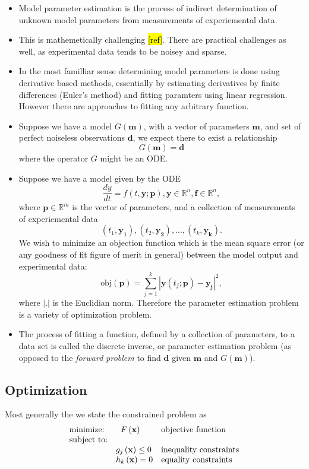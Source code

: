 \documentclass[10pt,a4paper]{article}
\begin{document}
\begin{itemize}
\item Model parameter estimation is the process of indirect determination of unknown model parameters  from measurements of experiemental data.
\item This is mathemetically challenging \hl{[ref]}. There are practical challenges as well, as experimental data tends to be noisey and sparse.
\item In the most familliar sense determining model parameters is done using derivative based methods, essentially by estimating derivatives by finite differences (Euler's method) and fitting paramters using linear regression. However there are approaches to fitting any arbitrary function.
\item Suppose we have a model $G(\mathbf{m})$, with a vector of parameters $\mathbf{m}$, and set of perfect noiseless observations $\mathbf{d}$, we expect there to exist a relationship 
\[G(\mathbf{m}) = \mathbf{d} \]
where the operator $G$ might be an ODE.
\item Suppose we have a model given by the ODE
\[ \frac{dy}{dt} = f(t, \mathbf{y}; \mathbf{p}), \mathbf{y} \in \mathbb{R}^n, \mathbf{f} \in \mathbb{R}^n ,\]
where $\mathbf{p} \in \mathbb{R}^m$ is the vector of parameters, and a collection of measurements of experiemental data
\[ \left( t_1, \mathbf{y_1} \right), 
\left( t_2, \mathbf{y_2} \right), ... ,
\left( t_k, \mathbf{y_k} \right).\]
We wish to minimize an objection function which is the mean square error (or any goodness of fit figure of merit in general) between the model output and experimental data:
\[ \mbox{obj}(\mathbf{p}) = \sum_{j=1}^k \left|\mathbf{y}(t_j; \mathbf{p}) - \mathbf{y_j} \right|^2,\]
where $| . |$ is the Euclidian norm. Therefore the parameter estimation problem is a variety of optimization problem.
\item The process of fitting a function, defined by a collection of parameters, to a data set is called the discrete inverse, or parameter estimation problem (as opposed to the \emph{forward problem} to find $\mathbf{d}$ given $\mathbf{m}$ and $G(\mathbf{m})$).
\end{itemize}

\subsection*{Optimization}
Most generally the we state the constrained problem as 
\[
\begin{array}{lll}
\mbox{minimize:} & \hspace{2 mm} F\left(\mathbf{x}\right) & \mbox{objective function}\\
\mbox{subject to:} & & \\
& \centering g_j \left( \mathbf{x} \right) \leq 0 & \mbox{inequality constraints}\\
& \centering h_k \left(\mathbf{x} \right) = 0 & \mbox{equality constraints}
\end{array}
 \]
\end{document}
